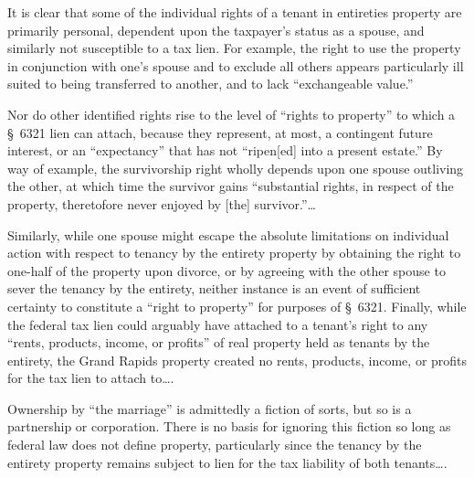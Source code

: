 It is clear that some of the individual rights of a tenant in entireties
property are primarily personal, dependent upon the taxpayer's status as a
spouse, and similarly not susceptible to a tax lien. For example, the right to
use the property in conjunction with one's spouse and to exclude all others
appears particularly ill suited to being transferred to another, and to lack
``exchangeable value.''

Nor do other identified rights rise to the level of ``rights to property'' to
which a \S~6321 lien can attach, because they represent, at most, a
contingent future interest, or an ``expectancy'' that has not ``ripen[ed] into
a present estate.'' By way of example, the survivorship right wholly depends
upon one spouse outliving the other, at which time the survivor gains
``substantial rights, in respect of the property, theretofore never enjoyed by
[the] survivor.''\dots

Similarly, while one spouse might escape the absolute limitations on individual
action with respect to tenancy by the entirety property by obtaining the right
to one-half of the property upon divorce, or by agreeing with the other spouse
to sever the tenancy by the entirety, neither instance is an event of
sufficient certainty to constitute a ``right to property'' for purposes of
\S~6321. Finally, while the federal tax lien could arguably have attached to a
tenant's right to any ``rents, products, income, or profits'' of real property
held as tenants by the entirety, the Grand Rapids property created no rents,
products, income, or profits for the tax lien to attach to\dots.

Ownership by ``the marriage'' is admittedly a fiction of sorts, but so is a
partnership or corporation. There is no basis for ignoring this fiction so long
as federal law does not define property, particularly since the tenancy by the
entirety property remains subject to lien for the tax liability of both
tenants\dots.

